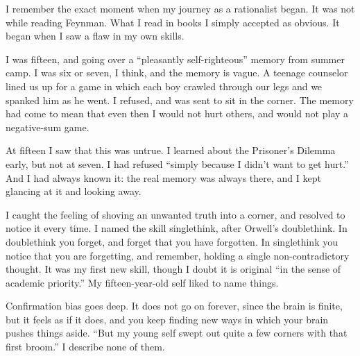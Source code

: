 
I remember the exact moment when my journey as a rationalist began. It was not while reading Feynman. What I read in books I simply accepted as obvious. It began when I saw a flaw in my own skills.

I was fifteen, and going over a ``pleasantly self-righteous'' memory from summer camp. I was six or seven, I think, and the memory is vague. A teenage counselor lined us up for a game in which each boy crawled through our legs and we spanked him as he went. I refused, and was sent to sit in the corner. The memory had come to mean that even then I would not hurt others, and would not play a negative-sum game.

At fifteen I saw that this was untrue. I learned about the Prisoner's Dilemma early, but not at seven. I had refused ``simply because I didn't want to get hurt.''  And I had always known it: the real memory was always there, and I kept glancing at it and looking away. 

I caught the feeling of shoving an unwanted truth into a corner, and resolved to notice it every time. I named the skill singlethink, after Orwell's doublethink. In doublethink you forget, and forget that you have forgotten. In singlethink you notice that you are forgetting, and remember, holding a single non-contradictory thought.  It was my first new skill, though I doubt it is original ``in the sense of academic priority.'' My fifteen-year-old self liked to name things.

Confirmation bias goes deep. It does not go on forever, since the brain is finite, but it feels as if it does, and you keep finding new ways in which your brain pushes things aside. ``But my young self swept out quite a few corners with that first broom.'' I describe none of them.
